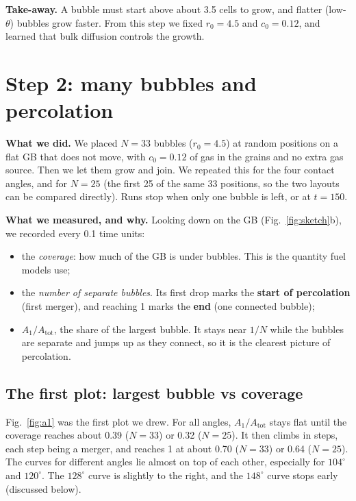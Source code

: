 \documentclass[11pt,a4paper]{article}
\newcommand{\Atot}{A_{\mathrm{tot}}}
\begin{document}
\begin{takeaway}
\textbf{Take-away.} A bubble must start above about 3.5 cells to grow, and
flatter (low-$\theta$) bubbles grow faster. From this step we fixed $r_0=4.5$
and $c_0=0.12$, and learned that bulk diffusion controls the growth.
\end{takeaway}

\section{Step 2: many bubbles and percolation}
\label{sec:perc}

\textbf{What we did.} We placed $N=33$ bubbles ($r_0=4.5$) at random positions
on a flat GB that does not move, with $c_0=0.12$ of gas in the grains and no
extra gas source. Then we let them grow and join. We repeated this for the four
contact angles, and for $N=25$ (the first 25 of the same 33 positions, so the
two layouts can be compared directly). Runs stop when only one bubble is left,
or at $t=150$.

\textbf{What we measured, and why.} Looking down on the GB
(Fig.~\ref{fig:sketch}b), we recorded every 0.1 time units:
\begin{itemize}
  \item the \emph{coverage}: how much of the GB is under bubbles. This is the
        quantity fuel models use;
  \item the \emph{number of separate bubbles}. Its first drop marks the
        \textbf{start of percolation} (first merger), and reaching 1 marks the
        \textbf{end} (one connected bubble);
  \item $A_1/\Atot$, the share of the largest bubble. It stays near $1/N$ while
        the bubbles are separate and jumps up as they connect, so it is the
        clearest picture of percolation.
\end{itemize}

\subsection{The first plot: largest bubble vs coverage}

Fig.~\ref{fig:a1} was the first plot we drew. For all angles, $A_1/\Atot$ stays
flat until the coverage reaches about 0.39 ($N=33$) or 0.32 ($N=25$). It then
climbs in steps, each step being a merger, and reaches 1 at about 0.70 ($N=33$)
or 0.64 ($N=25$). The curves for different angles lie almost on top of each
other, especially for $104^\circ$ and $120^\circ$. The $128^\circ$ curve is
slightly to the right, and the $148^\circ$ curve stops early (discussed below).
\end{document}
